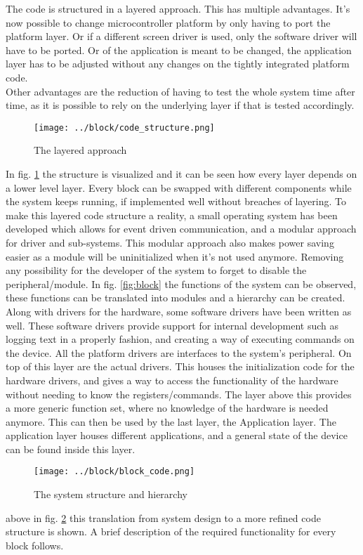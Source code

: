 The code is structured in a layered approach. This has multiple advantages. It's now possible to change microcontroller platform by only having to port the platform layer. Or if a different screen driver is used, only the software driver will have to be ported. Or of the application is meant to be changed, the application layer  has to be adjusted without any changes on the tightly integrated platform code.\\
Other advantages are the reduction of having to test the whole system time after time, as it is possible to rely on the underlying layer if that is tested accordingly.\\
\begin{figure}[H]
	\centering
	\label{fig:code_structure}
	\texttt{[image: ../block/code\_structure.png]}
	\caption{The layered approach}
\end{figure}
In fig. \ref{fig:code_structure} the structure is visualized and it can be seen how every layer depends on a lower level layer. Every block can be swapped with different components while the system keeps running, if implemented well without breaches of layering.\newpar
To make this layered code structure a reality, a small operating system has been developed which allows for event driven communication, and a modular approach for driver and sub-systems. This modular approach also makes power saving easier as a module will be uninitialized when it's not used anymore. Removing any possibility for the developer of the system to forget to disable the peripheral/module.\newpar
In fig. \ref{fig:block} the functions of the system can be observed, these functions can be translated into modules and a hierarchy can be created. Along with drivers for the hardware, some software drivers have been written as well. These software drivers provide support for internal development such as logging text in a properly fashion, and creating a way of executing commands on the device. All the platform drivers are interfaces to the system's peripheral. On top of this layer are the actual drivers. This houses the initialization code for the hardware drivers, and gives a way to access the functionality of the hardware without needing to know the registers/commands. The layer above this provides a more generic function set, where no knowledge of the hardware is needed anymore. This can then be used by the last layer, the Application layer. The application layer houses different applications, and a general state of the device can be found inside this layer.
\begin{figure}[H]
	\centering
	\label{fig:block_code}
	\texttt{[image: ../block/block\_code.png]}
	\caption{The system structure and hierarchy}
\end{figure}
above in fig. \ref{fig:block_code} this translation from system design to a more refined code structure is shown. A brief description of the required functionality for every block follows. 
